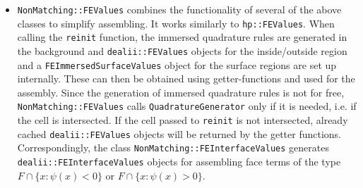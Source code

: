 \documentclass{ansarticle-preprint}
\begin{document}
\begin{itemize}
  \item \texttt{NonMatching::FEValues} combines the functionality of several of the above classes to simplify assembling. It works similarly to \texttt{hp::FEValues}.
  When calling the \texttt{reinit} function, the immersed quadrature rules are generated in the background and 
  \texttt{dealii::FEValues} objects for the inside/outside region and a \texttt{FEImmersedSurfaceValues} object for the surface regions are set up internally. These can then be obtained using getter-functions and used for the assembly.
  Since the generation of immersed quadrature rules is not for free,
  \texttt{NonMatching::FEValues} calls  \texttt{QuadratureGenerator} only if it is needed, i.e. if the cell is intersected. If the cell passed to \texttt{reinit} is not intersected, already cached \texttt{dealii::FEValues} objects will be returned by the getter functions.
  Correspondingly, the class \texttt{NonMatching::FEInterfaceValues} generates
  \texttt{dealii::FEInterfaceValues} objects for assembling face terms of the type $F \cap \{x : \psi(x) < 0 \}$ or $F \cap \{x : \psi(x) > 0 \}$.
\end{itemize}
\end{document}
